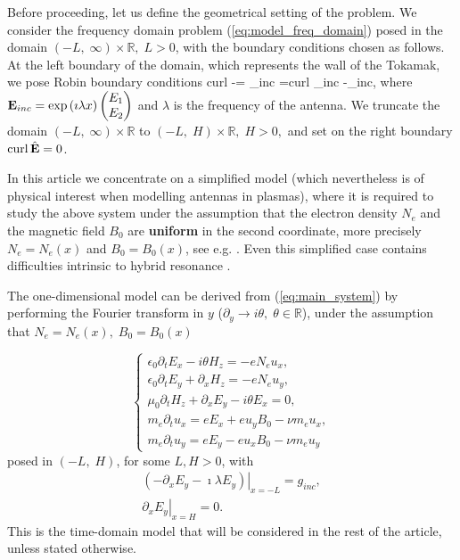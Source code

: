 {Before proceeding, let us define the geometrical setting of the problem. We consider the frequency domain problem (\ref{eq:model_freq_domain}) posed in the domain $(-L,\;\infty)\times\mathbb{R},\; L>0$, with the 
 boundary conditions chosen as follows. At the left boundary of the domain, which represents the wall of the Tokamak, we pose Robin boundary conditions 
\be
\label{eq:boundary_conditions_intro}
curl  -\imath \lambda{}\wedge \n = _{inc} =curl \E_{inc} -\imath\lambda\E_{inc}\wedge \n,
\ee
where ${\bf E}_{inc} = \exp \left(\imath \lambda x\right)\begin{pmatrix} E_1\\ E_2 \end{pmatrix}$ and $\lambda$ is 
the frequency of the antenna. We truncate the domain 
$(-L,\; \infty)\times\mathbb{R}$ to $(-L,\; H)\times\mathbb{R},\; H>0,$ and set on the right boundary $\operatorname{curl} \hat{{\bf E}} = 0$. 

In this article we concentrate on a simplified model (which nevertheless is of physical interest when modelling antennas in plasmas), 
where it is required to study the above system under the assumption that the electron density $N_{e}$ and the magnetic field $B_0$ are \textbf{uniform} in the second coordinate, more precisely 
$N_{e}=N_{e}(x)$ and $B_0=B_0(x)$, see e.g. \cite{Despres_2014}. Even this simplified case contains difficulties intrinsic to hybrid resonance \cite{Despres_2014, singular_solutions}. 

The one-dimensional model can be derived from (\ref{eq:main_system}) by performing the Fourier transform in $y$ ($\partial_y\rightarrow i\theta, \; \theta\in\mathbb{R}$), 
under the assumption that $N_e=N_e(x), \; B_0=B_0(x)$

\begin{equation}
 \label{eq:main_model}
\begin{cases}
\epsilon_0\partial_t E_{x}-i\theta H_z=-eN_e u_x,\\
\epsilon_0\partial_t E_{y}+\partial_x H_z=-eN_e u_y,\\
\mu_0\partial_t H_z+\partial_x E_y-i\theta E_x =0,\\
m_e\partial_t u_x=eE_x+eu_yB_0-\nu m_e u_x,\\
m_e\partial_t u_y=eE_y-eu_xB_0-\nu m_e u_y
\end{cases}
\end{equation}
 posed in $(-L,\; H)$, for some $L,H>0$, with 
 \begin{align}
 \label{eq:boundary_conditions_frequency_domain}
  \left.\left(-\partial_x E_y -\imath \lambda E_y\right)\right|_{x=-L} =g_{inc},\\
  \left.\partial_xE_y\right|_{x=H}=0.
 \end{align}
This is the time-domain model that will be considered in the rest of the article, unless stated otherwise. 

}
